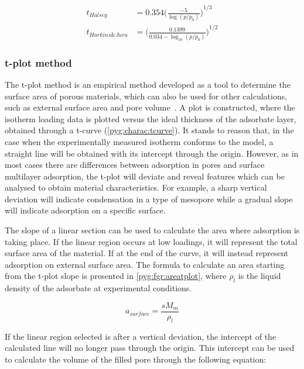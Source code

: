 \begin{align}
	t_{Halsey}        & = 0.354 {\Big(\frac{-5}{\log(p/p_0)}\Big)}^{1/3}            %
	\label{pyg:eqn:halsey}                                                          \\
	t_{Harkins\&Jura} & = {\Big(\frac{0.1399}{0.034 - \log_{10}(p/p_0)}\Big)}^{1/2} %
	\label{pyg:eqn:harkinsjura}
\end{align}

\subsubsection{t-plot method}\label{pyg:charac:tplot}

The t-plot method is an empirical method developed as a
tool to determine the surface area of porous materials,
which can also be used for other calculations, such as
external surface area and pore volume~\cite{lippensStudiesPoreSystems1965}.
A plot is constructed, where the isotherm loading
data is plotted versus the ideal thickness of the adsorbate layer,
obtained through a t-curve (\autoref{pyg:charac:tcurve}).
It stands to reason that, in the case when the experimentally measured
isotherm conforms to the model, a straight line will be obtained with its
intercept through the origin. However, as in most cases there
are differences between adsorption in pores and surface multilayer
adsorption, the t-plot will deviate and reveal features which can
be analysed to obtain material characteristics. For example, a sharp
vertical deviation will indicate condensation in a type of mesopore
while a gradual slope will indicate adsorption on a specific surface.

The slope of a linear section can be used to calculate the area where
adsorption is taking place. If the linear region occurs at low loadings,
it will represent the total surface area of the material.
If at the end of the curve, it will instead represent adsorption on
external surface area. The formula to calculate an area starting
from the t-plot slope is presented in \autoref{pyg:fgr:areatplot},
where \(\rho_{l}\) is the liquid density of the adsorbate at experimental
conditions.

\begin{equation}\label{pyg:fgr:areatplot}
	a_{surface} = \frac{s M_m}{\rho_{l}}
\end{equation}

If the linear region selected is after a vertical deviation,
the intercept of the calculated line will no longer pass through
the origin. This intercept can be used to calculate the volume of
the filled pore through the following equation:

